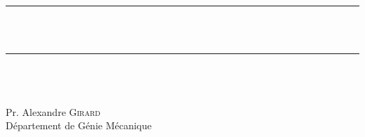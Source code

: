 \begin{titlepage}
\newcommand{\HRule}{\rule{\linewidth}{0.5mm}} %

\center %
 

\textsc{\LARGE 
}\\[1.5cm] 




\HRule \\[0.4cm]
{\huge \bfseries 
\iftoggle{EN}{%
Dynamic programming, optimal control and reinforcement learning
}{%
Programmation dynamique, commande optimale et apprentissage par renforcement
}
}\\[0.4cm] %
\HRule \\[1.5cm]
 
\textsc{\LARGE
\iftoggle{EN}{%
A unified approach for analyzing and optimizing real-time decision making algorithms
}{%
Une approche unifiée pour analyser et optimiser les algorithmes de prises de décisions en temps-réel
}
}\\[1.5cm] 
 

{\large 
\iftoggle{EN}{%
by
}{%
préparé par
}
}\\[0.7cm]
{\LARGE Pr. Alexandre \textsc{Girard} }\\[0.7cm] 
{\LARGE Département de Génie Mécanique }\\[1.5cm]



\end{titlepage}
